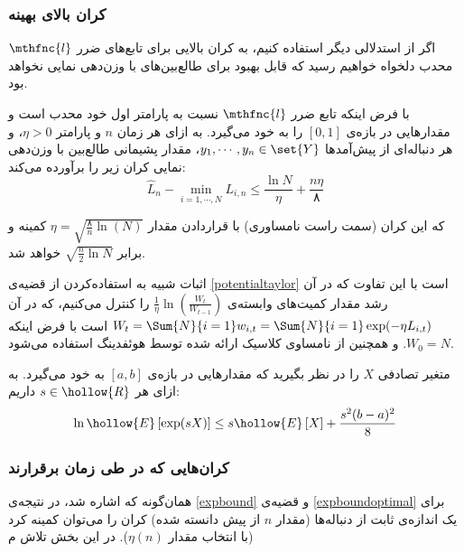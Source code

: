 \documentclass[a4paper,11px]{article}
\begin{document}
\subsubsection{
کران بالای بهینه
}
اگر از استدلالی دیگر استفاده کنیم، به کران بالایی برای تابع‌های ضرر
$\mthfnc{l}$ 
محدب دلخواه خواهیم رسید که قابل بهبود برای طالع‌بین‌‌های با وزن‌دهی نمایی نخواهد بود.
\begin{theorem}
\label{expboundoptimal}
با فرض اینکه تابع ضرر 
$\mthfnc{l}$ 
نسبت به پارامتر اول خود محدب است و مقدارهایی در بازه‌ی 
$[0,1]$ 
را به خود می‌گیرد. به ازای هر زمان 
$n$ 
و پارامتر 
$\eta > 0$، 
و هر دنباله‌ای از پیش‌آمدها 
$y_1, \cdots, y_n \in \set{Y}$، 
مقدار پشیمانی طالع‌بین با وزن‌دهی نمایی کران زیر را برآورده می‌کند:
\[
\hat{L}_n - \min_{i=1,\cdots,N} L_{i,n} \leq \frac{\ln N}{\eta} + \frac{n \eta}{۸}
\]

که این کران (سمت راست نامساوری) با قراردادن مقدار 
$\eta = \sqrt{ \frac{۸}{n} \ln(N) }$ 
کمینه و برابر 
$\sqrt{\frac{n}{2}\ln N}$ 
خواهد شد.
\end{theorem}

اثبات شبیه به استفاده‌کردن از قضیه‌ی 
\ref{potentialtaylor} 
است با این تفاوت که در آن رشد مقدار کمیت‌های وابسته‌ی 
$\frac{1}{\eta} \ln \left( \frac{W_t}{W_{t-1}} \right)$ 
را کنترل می‌کنیم، که در آن 
$W_t = \Sum{N}{i=1} w_{i,t} = \Sum{N}{i=1} \exp( -\eta L_{i,t} )$ 
است با فرض اینکه 
$W_0 = N$. 
و همچنین از نامساوی کلاسیک ارائه شده توسط هوئفدینگ
\cite{hoeffding1963} 
استفاده می‌شود.
\begin{lemma}
\label{hoeffding}
متغیر تصادفی 
$X$ 
را در نظر بگیرید که مقدارهایی در بازه‌ی 
$[a,b]$ 
به خود می‌گیرد. به ازای هر 
$s \in \hollow{R}$ 
داریم:
\[
\ln \hollow{E} \left[ \exp(s X) \right] \leq s \hollow{E} \left[ X \right] + \frac{ s^2 (b-a)^2 }{8}
\]

\end{lemma}


\subsubsection{
کران‌هایی که در طی زمان برقرارند
}
همان‌گونه که اشاره شد، در نتیجه‌ی
\ref{expbound} 
و قضیه‌ی 
\ref{expboundoptimal} 
برای یک اندازه‌ی ثابت از دنباله‌ها (مقدار 
$n$ 
از پیش دانسته شده) کران را می‌توان کمینه کرد (با انتخاب مقدار 
$\eta(n)$). 
در این بخش تلاش م
\end{document}
